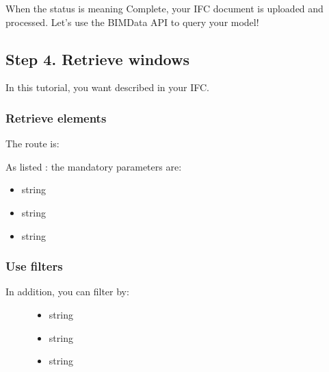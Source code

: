 \documentclass[a4paper,12pt,english]{sphinxmanual}
\begin{document}
When the status is  meaning Complete, your IFC document is uploaded and processed.
Let’s use the BIMData API to query your model!


\subsection{Step 4. Retrieve windows}
\label{\detokenize{tutorials/retrieve-elements:step-4-retrieve-windows}}
In this tutorial, you want  described in your IFC.


\subsubsection{Retrieve elements}
\label{\detokenize{tutorials/retrieve-elements:retrieve-elements}}
The route is: 

As listed :
the mandatory parameters are:
\begin{itemize}
\item {} 
 string

\item {} 
 string

\item {} 
 string

\end{itemize}


\subsubsection{Use filters}
\label{\detokenize{tutorials/retrieve-elements:use-filters}}\begin{description}
\item[{In addition, you can filter by:}] \leavevmode\begin{itemize}
\item {} 
 string

\item {} 
 string

\item {} 
 string

\end{itemize}

\end{description}
\end{document}

